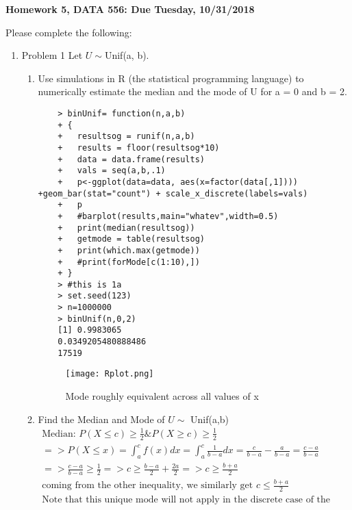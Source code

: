 \documentclass[11pt]{article}
\begin{document}
\begin{title}
	{\Large\bf Homework 5, DATA 556: Due Tuesday, 10/31/2018}
\end{title}

\author{\bf Alexander Van Roijen}

\maketitle

\newpage
Please complete the following:
\begin{enumerate}
\item Problem 1
Let $U \sim $Unif(a, b).
\begin{enumerate}
	\item Use simulations in R (the statistical programming language) to numerically estimate the median and
	the mode of U for a = 0 and b = 2.
	\begin{verbatim}
	> binUnif= function(n,a,b)
	+ {
	+   resultsog = runif(n,a,b)
	+   results = floor(resultsog*10)
	+   data = data.frame(results)
	+   vals = seq(a,b,.1)
	+   p<-ggplot(data=data, aes(x=factor(data[,1]))) +geom_bar(stat="count") + scale_x_discrete(labels=vals)
	+   p
	+   #barplot(results,main="whatev",width=0.5)
	+   print(median(resultsog))
	+   getmode = table(resultsog)
	+   print(which.max(getmode))
	+   #print(forMode[c(1:10),])
	+ }
	> #this is 1a
	> set.seed(123)
	> n=1000000
	> binUnif(n,0,2)
	[1] 0.9983065
	0.0349205480888486 
	17519 
	\end{verbatim}
	\begin{figure}[H]
		\centering
		\caption{Mode roughly equivalent across all values of x}
		\texttt{[image: Rplot.png]}
	\end{figure}
	\item Find the Median and Mode of $U \sim $ Unif(a,b)
	\begin{gather}
	\text{Median: }P(X\le c) \ge \frac{1}{2} \&  P(X\ge c) \ge \frac{1}{2} \\
	=> P(X\le x) = \int_{a}^{c}f(x)dx = \int_{a}^{c}\frac{1}{b-a}dx =\frac{c}{b-a} - \frac{a}{b-a} = \frac{c-a}{b-a}\\
	=> \frac{c-a}{b-a} \ge \frac{1}{2} => c \ge \frac{b-a}{2} + \frac{2a}{2} => c\ge \frac{b+a}{2}\\
	\text{coming from the other inequality, we similarly get }c \le \frac{b+a}{2}\\
	\text{Note that this unique mode will not apply in the discrete case of the uniform distribution}\\

\end{gather}
\end{enumerate}
\end{enumerate}
\end{document}
